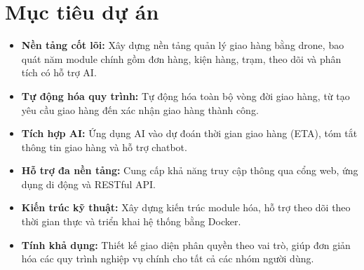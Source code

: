 \section{Mục tiêu dự án}

\begin{itemize}
\item
  \textbf{Nền tảng cốt lõi:} Xây dựng nền tảng quản lý giao hàng bằng drone, bao quát năm module chính gồm đơn hàng, kiện hàng, trạm, theo dõi và phân tích có hỗ trợ AI.
\item
  \textbf{Tự động hóa quy trình:} Tự động hóa toàn bộ vòng đời giao hàng, từ tạo yêu cầu giao hàng đến xác nhận giao hàng thành công.
\item
  \textbf{Tích hợp AI:} Ứng dụng AI vào dự đoán thời gian giao hàng (ETA), tóm tắt thông tin giao hàng và hỗ trợ chatbot.
\item
  \textbf{Hỗ trợ đa nền tảng:} Cung cấp khả năng truy cập thông qua cổng web, ứng dụng di động và RESTful API.
\item
  \textbf{Kiến trúc kỹ thuật:} Xây dựng kiến trúc module hóa, hỗ trợ theo dõi theo thời gian thực và triển khai hệ thống bằng Docker.
\item
  \textbf{Tính khả dụng:} Thiết kế giao diện phân quyền theo vai trò, giúp đơn giản hóa các quy trình nghiệp vụ chính cho tất cả các nhóm người dùng.
\end{itemize}

